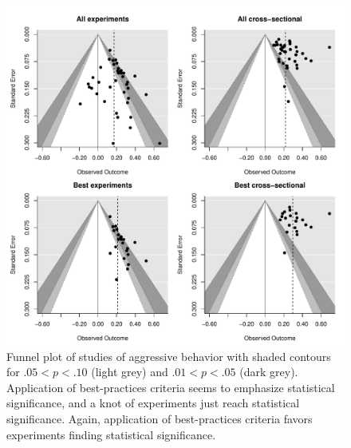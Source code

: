 \documentclass[man, mask]{apa6}
\begin{document}
\begin{figure}
	\includegraphics[width = \textwidth, keepaspectratio]{funnels-0_AggBeh.pdf}
	\caption{Funnel plot of studies of aggressive behavior with shaded contours for $.05 < p < .10$ (light grey) and $.01 < p < .05$ (dark grey). Application of best-practices criteria seems to emphasize statistical significance, and a knot of experiments just reach statistical significance. Again, application of best-practices criteria favors experiments finding statistical significance.}
	\label{funnel-aggbeh}
\end{figure}
\end{document}
